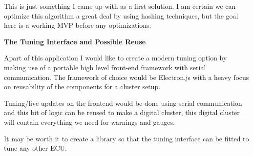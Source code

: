\documentclass{article}
\begin{document}
This is just something I came up with as a first solution, I am certain we can optimize this algorithm a great deal by using hashing techniques, but the goal here is a working MVP before any optimizations.
\newpage

\textbf{The Tuning Interface and Possible Reuse}
\vspace{0.2cm}

Apart of this application I would like to create a modern tuning option by making use of a portable high level front-end framework with serial communication. The framework of choice would be Electron.js with a heavy focus on reusability of the components for a cluster setup.

\vspace{0.2cm}
Tuning/live updates on the frontend would be done using serial communication and this bit of logic can be reused to make a digital cluster, this digital cluster will contain everything we need for warnings and gauges.

\vspace{0.2cm}
It may be worth it to create a library so that the tuning interface can be fitted to tune any other ECU.
\end{document}
